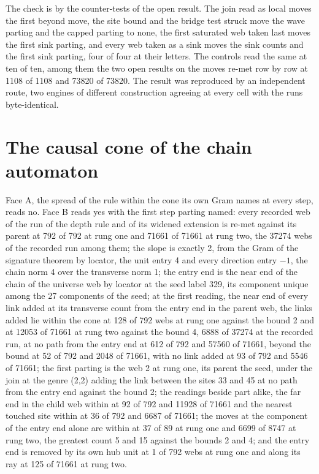 \begin{chproof}[census]
The check is by the counter-tests of the open result. The join read as local moves the first beyond move, the site bound and the bridge test struck move the wave parting and the capped parting to none, the first saturated web taken last moves the first sink parting, and every web taken as a sink moves the sink counts and the first sink parting, four of four at their letters. The controls read the same at ten of ten, among them the two open results on the moves re-met row by row at 1108 of 1108 and 73820 of 73820.
The result was reproduced by an independent route, two engines of different construction agreeing at every cell with the runs byte-identical.
\end{chproof}

\section{The causal cone of the chain automaton}\label{mod:X-12-D545567-w-ccds}
\begin{chwall}
Face A, the spread of the rule within the cone its own Gram names at every step, reads no. Face B reads yes with the first step parting named: every recorded web of the run of the depth rule and of its widened extension is re-met against its parent at 792 of 792 at rung one and 71661 of 71661 at rung two, the 37274 webs of the recorded run among them; the slope is exactly 2, from the Gram of the signature theorem by locator, the unit entry 4 and every direction entry $-1$, the chain norm 4 over the transverse norm 1; the entry end is the near end of the chain of the universe web by locator at the seed label 329, its component unique among the 27 components of the seed; at the first reading, the near end of every link added at its transverse count from the entry end in the parent web, the links added lie within the cone at 128 of 792 webs at rung one against the bound 2 and at 12053 of 71661 at rung two against the bound 4, 6888 of 37274 at the recorded run, at no path from the entry end at 612 of 792 and 57560 of 71661, beyond the bound at 52 of 792 and 2048 of 71661, with no link added at 93 of 792 and 5546 of 71661; the first parting is the web 2 at rung one, its parent the seed, under the join at the genre (2,2) adding the link between the sites 33 and 45 at no path from the entry end against the bound 2; the readings beside part alike, the far end in the child web within at 92 of 792 and 11928 of 71661 and the nearest touched site within at 36 of 792 and 6687 of 71661; the moves at the component of the entry end alone are within at 37 of 89 at rung one and 6699 of 8747 at rung two, the greatest count 5 and 15 against the bounds 2 and 4; and the entry end is removed by its own hub unit at 1 of 792 webs at rung one and along its ray at 125 of 71661 at rung two.
\end{chwall}

